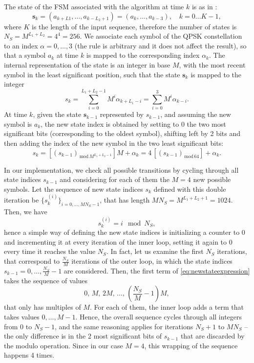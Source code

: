 \documentclass[10pt]{article}
\newcommand{\lmod}[1] {_{\,\mathrm{mod}\,#1}}
\begin{document}
The state of the FSM associated with the algorithm at time $k$ is as in \cite{bc}:
\begin{equation}
	\mathbf{s}_k = (a_{k+L1}, \ldots, a_{k-L_2+1}) = (a_k, \ldots, a_{k-3}), \quad k=0...K-1,
	\label{eq:state}
\end{equation}
where $K$ is the length of the input sequence, therefore the number of states is $N_S = M ^ {L_1 + L_2} = 4^4 = 256$. We associate each symbol of the QPSK constellation to an index $\alpha = 0,\ldots,3$ (the rule is arbitrary and it does not affect the result), so that a symbol $a_k$ at time $k$ is mapped to the corresponding index $\alpha_k$. The internal representation of the state is an integer in base $M$, with the most recent symbol in the least significant position, such that the state $\mathbf{s}_k$ is mapped to the integer
\begin{equation}
s_k = \sum_{i=0}^{L_1+L_2-1} M^i \alpha_{k+L_1-i} = \sum_{i=0}^{3} M^i \alpha_{k-i}.
\end{equation}
At time $k$, given the state $\mathbf{s}_{k-1}$ represented by $s_{k-1}$, and assuming the new symbol is $a_k$, the new state index is obtained by setting to 0 the two most significant bits (corresponding to the oldest symbol), shifting left by 2 bits and then adding the index of the new symbol in the two least significant bits:
\begin{equation}
s_k = \left[ (s_{k-1}) \lmod{M^{L_1+L_2-1}} \right] M + \alpha_k = 4 \, \left[ (s_{k-1})\lmod{64} \right] + \alpha_k.
\label{eq:newstateexpression}\end{equation}

In our implementation, we check all possible transitions by cycling through all state indices $s_{k-1}$ and considering for each of them the $M=4$ new possible symbols. Let the sequence of new state indices $s_k$ defined with this double iteration be $\{ s_k^{(i)} \}_{i=0,\ldots,MN_S-1}$, that has length $MN_S = M^{L_1+L_2+1} = 1024$.  Then, we have
\begin{equation}
s_k^{(i)} = i \mod N_S,
\end{equation}
hence a simple way of defining the new state indices is initializing a counter to 0 and incrementing it at every iteration of the inner loop, setting it again to 0 every time it reaches the value $N_S$. In fact, let us examine the first $N_S$ iterations, that correspond to $\frac{N_S}{M}$ iterations of the outer loop, in which the state indices $s_{k-1} = 0,\ldots,\frac{N_S}{M}-1$ are considered. Then, the first term of \eqref{eq:newstateexpression} takes the sequence of values
\begin{equation}
0,\,M,\,2M,\,\ldots,\,\left(\frac{N_S}{M}-1\right)M,
\end{equation}
that only has multiples of $M$. For each of them, the inner loop adds a term that takes values $0,\ldots,M-1$. Hence, the overall sequence cycles through all integers from $0$ to $N_S-1$, and the same reasoning applies for iterations $N_S +1$ to $MN_S$ -- the only difference is in the 2 most significant bits of $s_{k-1}$ that are discarded by the modulo operation. Since in our case $M=4$, this wrapping of the sequence happens 4 times.
\end{document}

